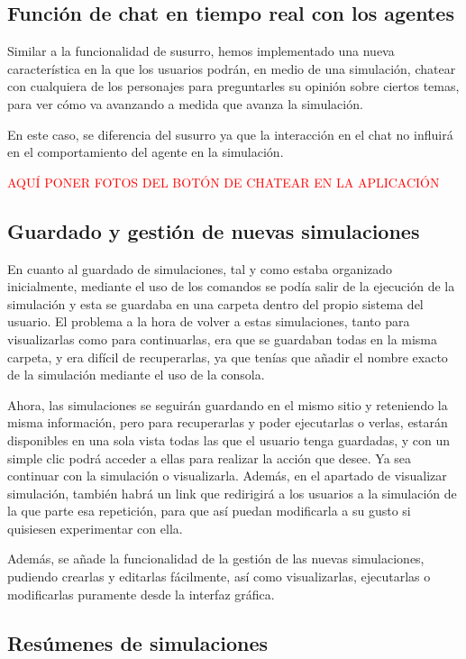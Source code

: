 \subsection{Función de chat en tiempo real con los agentes}
Similar a la funcionalidad de susurro, hemos implementado una nueva característica en la que los usuarios podrán, en medio de una simulación, chatear con cualquiera de los personajes para preguntarles su opinión sobre ciertos temas, para ver cómo va avanzando a medida que avanza la simulación.

En este caso, se diferencia del susurro ya que la interacción en el chat no influirá en el comportamiento del agente en la simulación.

\textcolor{red}{AQUÍ PONER FOTOS DEL BOTÓN DE CHATEAR EN LA APLICACIÓN}

\subsection{Guardado y gestión de nuevas simulaciones}

En cuanto al guardado de simulaciones, tal y como estaba organizado inicialmente, mediante el uso de los comandos se podía salir de la ejecución de la simulación y esta se guardaba en una carpeta dentro del propio sistema del usuario. El problema a la hora de volver a estas simulaciones, tanto para visualizarlas como para continuarlas, era que se guardaban todas en la misma carpeta, y era difícil de recuperarlas, ya que tenías que añadir el nombre exacto de la simulación mediante el uso de la consola.

Ahora, las simulaciones se seguirán guardando en el mismo sitio y reteniendo la misma información, pero para recuperarlas y poder ejecutarlas o verlas, estarán disponibles en una sola vista todas las que el usuario tenga guardadas, y con un simple clic podrá acceder a ellas para realizar la acción que desee. Ya sea continuar con la simulación o visualizarla. Además, en el apartado de visualizar simulación, también habrá un link que redirigirá a los usuarios a la simulación de la que parte esa repetición, para que así puedan modificarla a su gusto si quisiesen experimentar con ella.

Además, se añade la funcionalidad de la gestión de las nuevas simulaciones, pudiendo crearlas y editarlas fácilmente, así como visualizarlas, ejecutarlas o modificarlas puramente desde la interfaz gráfica.

\subsection{Resúmenes de simulaciones}


